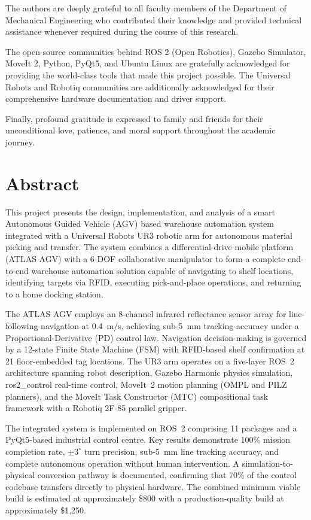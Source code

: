 \documentclass[12pt,a4paper,oneside]{report}
\begin{document}
The authors are deeply grateful to all faculty members of the Department of Mechanical Engineering who contributed their knowledge and provided technical assistance whenever required during the course of this research.

The open-source communities behind ROS 2 (Open Robotics), Gazebo Simulator, MoveIt 2, Python, PyQt5, and Ubuntu Linux are gratefully acknowledged for providing the world-class tools that made this project possible. The Universal Robots and Robotiq communities are additionally acknowledged for their comprehensive hardware documentation and driver support.

Finally, profound gratitude is expressed to family and friends for their unconditional love, patience, and moral support throughout the academic journey.

\newpage

\chapter*{Abstract}

This project presents the design, implementation, and analysis of a smart Autonomous Guided Vehicle (AGV) based warehouse automation system integrated with a Universal Robots UR3 robotic arm for autonomous material picking and transfer. The system combines a differential-drive mobile platform (ATLAS AGV) with a 6-DOF collaborative manipulator to form a complete end-to-end warehouse automation solution capable of navigating to shelf locations, identifying targets via RFID, executing pick-and-place operations, and returning to a home docking station.

The ATLAS AGV employs an 8-channel infrared reflectance sensor array for line-following navigation at 0.4~m/s, achieving sub-5~mm tracking accuracy under a Proportional-Derivative (PD) control law. Navigation decision-making is governed by a 12-state Finite State Machine (FSM) with RFID-based shelf confirmation at 21 floor-embedded tag locations. The UR3 arm operates on a five-layer ROS~2 architecture spanning robot description, Gazebo Harmonic physics simulation, ros2\_control real-time control, MoveIt~2 motion planning (OMPL and PILZ planners), and the MoveIt Task Constructor (MTC) compositional task framework with a Robotiq 2F-85 parallel gripper.

The integrated system is implemented on ROS~2 comprising 11 packages and a PyQt5-based industrial control centre. Key results demonstrate 100\% mission completion rate, $\pm 3^{\circ}$ turn precision, sub-5~mm line tracking accuracy, and complete autonomous operation without human intervention. A simulation-to-physical conversion pathway is documented, confirming that 70\% of the control codebase transfers directly to physical hardware. The combined minimum viable build is estimated at approximately \$800 with a production-quality build at approximately \$1,250.
\end{document}
